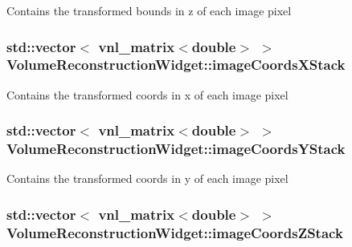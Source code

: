 Contains the transformed bounds in z of each image pixel \hypertarget{class_volume_reconstruction_widget_af74830d4db64cc68e46eb49d261f537e}{
\subsubsection[{image\-Coords\-X\-Stack}]{\setlength{\rightskip}{0pt plus 5cm}std\-::vector$<$ vnl\-\_\-matrix$<$double$>$ $>$ {\bf Volume\-Reconstruction\-Widget\-::image\-Coords\-X\-Stack}}}\label{d5/d55/class_volume_reconstruction_widget_af74830d4db64cc68e46eb49d261f537e}
Contains the transformed coords in x of each image pixel \hypertarget{class_volume_reconstruction_widget_a510a59c37345dfc2e0e3593a5384d664}{
\subsubsection[{image\-Coords\-Y\-Stack}]{\setlength{\rightskip}{0pt plus 5cm}std\-::vector$<$ vnl\-\_\-matrix$<$double$>$ $>$ {\bf Volume\-Reconstruction\-Widget\-::image\-Coords\-Y\-Stack}}}\label{d5/d55/class_volume_reconstruction_widget_a510a59c37345dfc2e0e3593a5384d664}
Contains the transformed coords in y of each image pixel \hypertarget{class_volume_reconstruction_widget_addd1ebae781cf60c4a4dff76bc6b6a2c}{
\subsubsection[{image\-Coords\-Z\-Stack}]{\setlength{\rightskip}{0pt plus 5cm}std\-::vector$<$ vnl\-\_\-matrix$<$double$>$ $>$ {\bf Volume\-Reconstruction\-Widget\-::image\-Coords\-Z\-Stack}}}\label{d5/d55/class_volume_reconstruction_widget_addd1ebae781cf60c4a4dff76bc6b6a2c}

